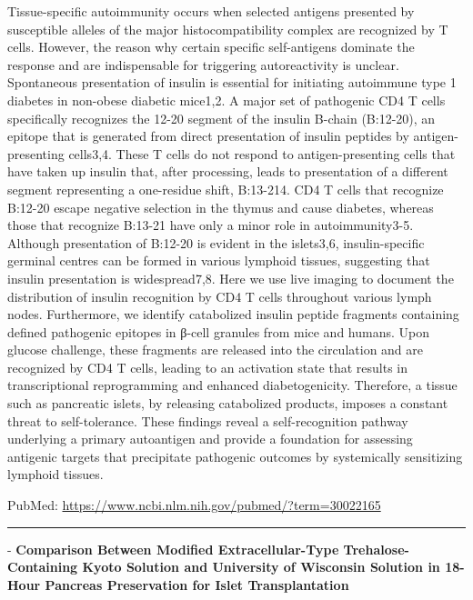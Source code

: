 \documentclass[]{article}
\begin{document}
Tissue-specific autoimmunity occurs when selected antigens presented by
susceptible alleles of the major histocompatibility complex are
recognized by T cells. However, the reason why certain specific
self-antigens dominate the response and are indispensable for triggering
autoreactivity is unclear. Spontaneous presentation of insulin is
essential for initiating autoimmune type 1 diabetes in non-obese
diabetic mice1,2. A major set of pathogenic CD4 T cells specifically
recognizes the 12-20 segment of the insulin B-chain (B:12-20), an
epitope that is generated from direct presentation of insulin peptides
by antigen-presenting cells3,4. These T cells do not respond to
antigen-presenting cells that have taken up insulin that, after
processing, leads to presentation of a different segment representing a
one-residue shift, B:13-214. CD4 T cells that recognize B:12-20 escape
negative selection in the thymus and cause diabetes, whereas those that
recognize B:13-21 have only a minor role in autoimmunity3-5. Although
presentation of B:12-20 is evident in the islets3,6, insulin-specific
germinal centres can be formed in various lymphoid tissues, suggesting
that insulin presentation is widespread7,8. Here we use live imaging to
document the distribution of insulin recognition by CD4 T cells
throughout various lymph nodes. Furthermore, we identify catabolized
insulin peptide fragments containing defined pathogenic epitopes in
β-cell granules from mice and humans. Upon glucose challenge, these
fragments are released into the circulation and are recognized by CD4 T
cells, leading to an activation state that results in transcriptional
reprogramming and enhanced diabetogenicity. Therefore, a tissue such as
pancreatic islets, by releasing catabolized products, imposes a constant
threat to self-tolerance. These findings reveal a self-recognition
pathway underlying a primary autoantigen and provide a foundation for
assessing antigenic targets that precipitate pathogenic outcomes by
systemically sensitizing lymphoid tissues.

PubMed: \url{https://www.ncbi.nlm.nih.gov/pubmed/?term=30022165}

{}

{}

\begin{center}\rule{0.5\linewidth}{\linethickness}\end{center}

 - \textbf{Comparison Between Modified Extracellular-Type
Trehalose-Containing Kyoto Solution and University of Wisconsin Solution
in 18-Hour Pancreas Preservation for Islet Transplantation}
\end{document}
